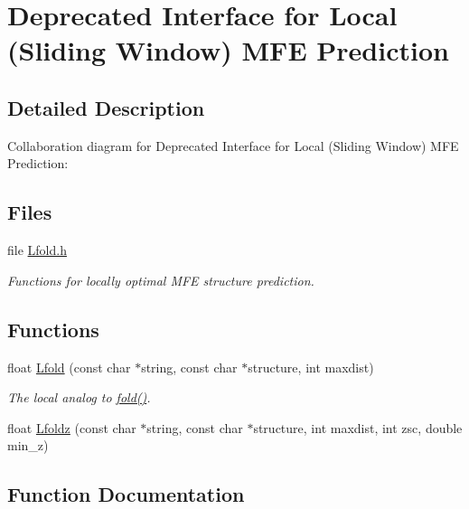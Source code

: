 \hypertarget{group__mfe__window__deprecated}{}\section{Deprecated Interface for Local (Sliding Window) M\+FE Prediction}
\label{group__mfe__window__deprecated}


\subsection{Detailed Description}
Collaboration diagram for Deprecated Interface for Local (Sliding Window) M\+FE Prediction\+:
\subsection*{Files}
\begin{DoxyCompactItemize}
\item 
file \mbox{\hyperlink{Lfold_8h}{Lfold.\+h}}
\begin{DoxyCompactList}\small\item\em Functions for locally optimal M\+FE structure prediction. \end{DoxyCompactList}\end{DoxyCompactItemize}
\subsection*{Functions}
\begin{DoxyCompactItemize}
\item 
float \mbox{\hyperlink{group__mfe__window__deprecated_gafdd1e11b5c7ad443b9f86b818e67bab4}{Lfold}} (const char $\ast$string, const char $\ast$structure, int maxdist)
\begin{DoxyCompactList}\small\item\em The local analog to \mbox{\hyperlink{group__mfe__global__deprecated_gaadafcb0f140795ae62e5ca027e335a9b}{fold()}}. \end{DoxyCompactList}\item 
float \mbox{\hyperlink{group__mfe__window__deprecated_ga9b568887c6091a54252729adcb35f6d2}{Lfoldz}} (const char $\ast$string, const char $\ast$structure, int maxdist, int zsc, double min\+\_\+z)
\end{DoxyCompactItemize}


\subsection{Function Documentation}
\mbox{\label{group__mfe__window__deprecated_gafdd1e11b5c7ad443b9f86b818e67bab4}} 
